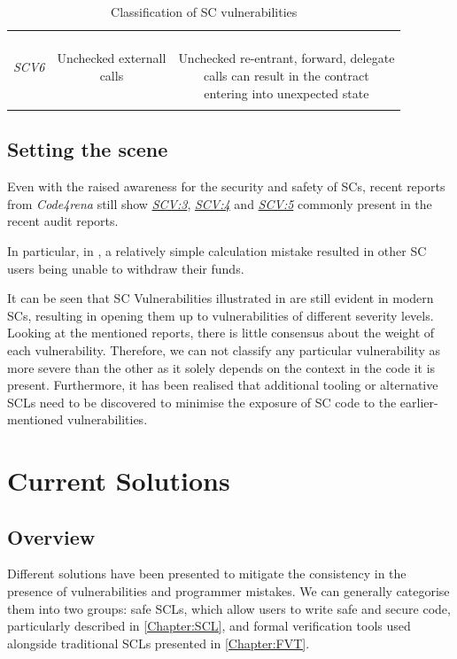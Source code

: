 \documentclass[oneside]{ecsproject}     %
\newcommand{\vref}[1]{\textit{\hyperref[#1]{#1}}}
\begin{document}
\begin{table}[!htb]
\begin{tabular}{ccc}
  \hline
  \textit{SCV6}\label{SCV:6} & \makecell{Unchecked externall\\calls} & \makecell{\\Unchecked re-entrant, forward, delegate\\calls can result in the contract\\entering into unexpected state}\\\\
  \bottomrule
  \end{tabular}
  \caption{Classification of SC vulnerabilities}
  \label{Table:classification}
\end{table}

\section{Setting the scene} \label{Section:Scene}

Even with the raised awareness for the security and safety of SCs, recent reports from \textit{Code4rena} still show \vref{SCV:3}, \vref{SCV:4} and \vref{SCV:5}
commonly present in the recent audit reports\cite{arcade_report}\cite{ondo_report}\cite{centrifuge_report}.

In particular, in \cite{centrifuge_report}, a relatively simple calculation mistake resulted in other SC users being unable to withdraw their funds.

It can be seen that SC Vulnerabilities illustrated in  are still evident in modern SCs, resulting in opening them up to vulnerabilities of different severity levels.
Looking at the mentioned reports, there is little consensus about the weight of each vulnerability.
Therefore, we can not classify any particular vulnerability as more severe than the other as it solely depends on the context in the code it is present.
Furthermore, it has been realised that additional tooling or alternative SCLs need to be discovered to minimise the exposure of SC code to the earlier-mentioned vulnerabilities.

\chapter{Current Solutions}

\section{Overview}

Different solutions have been presented to mitigate the consistency in the presence of vulnerabilities and programmer mistakes. 
We can generally categorise them into two groups: safe SCLs, which allow users to write safe and secure code, particularly described in \cref{Chapter:SCL}, 
and formal verification tools used alongside traditional SCLs presented in \cref{Chapter:FVT}.
\end{document}
